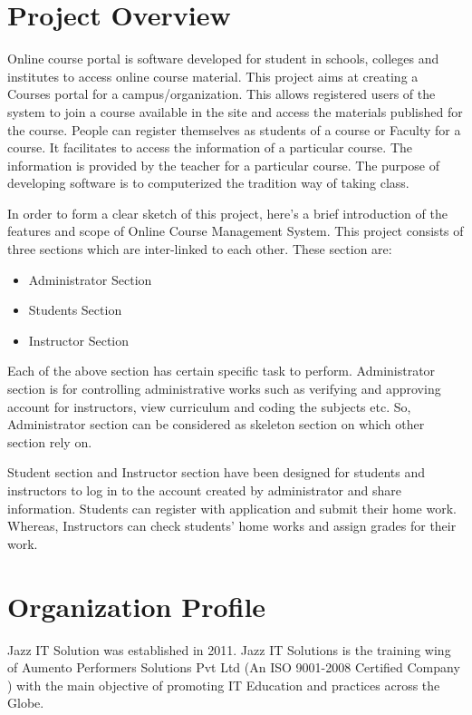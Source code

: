 \section{Project Overview}
Online course portal is software developed for student in schools, colleges and institutes to access online course material. This project aims at creating a Courses portal for a campus/organization. This allows registered users of the system to join a course available in the site and access the materials published for the course. People can register themselves as students of a course or Faculty for a course. It facilitates to access the information of a particular course. The information is provided by the teacher for a particular course. The purpose of developing software  is to computerized the tradition way of taking class.

In order to form a clear sketch of this project, here’s a brief introduction of the features and scope of Online Course Management System. This project consists of three sections which are inter-linked to each other. These section are:
\begin{itemize}
\item Administrator Section
\item Students Section
\item Instructor Section
\end{itemize}
Each of the above section has certain specific task to perform. Administrator section is for controlling administrative works such as verifying and approving account for  instructors, view curriculum and coding the subjects etc. So, Administrator section can be considered as skeleton section on which other section rely on.

Student section and Instructor section have been designed for students and instructors to log in to the account created by administrator and share information. Students can register with application and submit their home work. Whereas, Instructors can check students’ home works and assign grades for their work.
%
\section{Organization Profile}

Jazz IT Solution was established in 2011. Jazz IT Solutions is the training wing of Aumento Performers Solutions Pvt Ltd (An ISO 9001-2008 Certified Company ) with the main objective of promoting IT Education and practices across the Globe.


